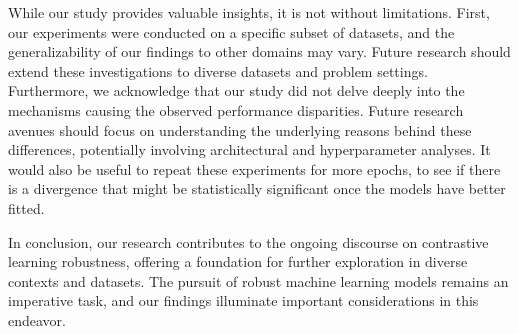 While our study provides valuable insights, it is not without limitations. First, our experiments were conducted on a specific subset of datasets, and the generalizability of our findings to other domains may vary. Future research should extend these investigations to diverse datasets and problem settings. Furthermore, we acknowledge that our study did not delve deeply into the mechanisms causing the observed performance disparities. Future research avenues should focus on understanding the underlying reasons behind these differences, potentially involving architectural and hyperparameter analyses. It would also be useful to repeat these experiments for more epochs, to see if there is a divergence that might be statistically significant once the models have better fitted.

In conclusion, our research contributes to the ongoing discourse on contrastive learning robustness, offering a foundation for further exploration in diverse contexts and datasets. The pursuit of robust machine learning models remains an imperative task, and our findings illuminate important considerations in this endeavor.